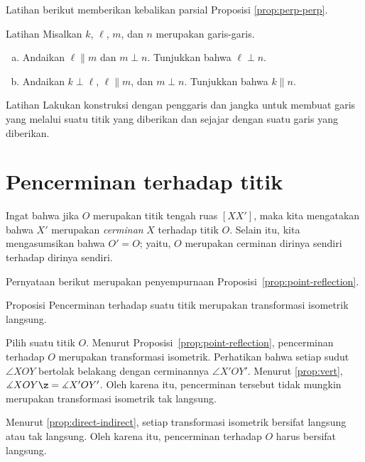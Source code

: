 Latihan berikut memberikan kebalikan parsial Proposisi \ref{prop:perp-perp}.

\begin{thm}[!]{Latihan}\label{ex:perp-perp}
Misalkan $k$, $\ell$, $m$, dan $n$ merupakan garis-garis.
\begin{enumerate}[(a)]
 \item\label{ex:perp-perp:a}
 Andaikan $\ell\parallel m$ dan $m\perp n$.
 Tunjukkan bahwa $\ell\perp n$.
 \item\label{ex:perp-perp:b}
 Andaikan $k\perp \ell$, $\ell\parallel m$, dan $m\perp n$.
 Tunjukkan bahwa $k\parallel n$.
\end{enumerate}

\end{thm}

\begin{thm}{Latihan}\label{ex:construction-parallel}
Lakukan konstruksi dengan penggaris dan jangka untuk membuat garis yang melalui suatu titik yang diberikan dan sejajar dengan suatu garis yang diberikan.
\end{thm}

\section{Pencerminan terhadap titik}

Ingat bahwa jika $O$ merupakan titik tengah ruas $[XX']$,
maka kita mengatakan bahwa $X'$ merupakan \emph{cerminan} $X$ terhadap titik $O$.
Selain itu, kita mengasumsikan bahwa $O'=O$; yaitu, $O$ merupakan cerminan dirinya sendiri terhadap dirinya sendiri.

Pernyataan berikut merupakan penyempurnaan Proposisi~\ref{prop:point-reflection}.

\begin{thm}[\abs]{Proposisi}\label{prop:point-reflection+}
Pencerminan terhadap suatu titik merupakan transformasi isometrik langsung.
\end{thm}

Pilih suatu titik $O$.
Menurut Proposisi~\ref{prop:point-reflection}, pencerminan terhadap $O$ merupakan transformasi isometrik.
Perhatikan bahwa setiap sudut $\angle XOY$ bertolak belakang dengan cerminannya $\angle X'OY'$.
Menurut \ref{prop:vert}, $\measuredangle XOY\z=\measuredangle X'OY'$.
Oleh karena itu, pencerminan tersebut tidak mungkin merupakan transformasi isometrik tak langsung.

Menurut \ref{prop:direct-indirect}, setiap transformasi isometrik bersifat langsung atau tak langsung.
Oleh karena itu, pencerminan terhadap $O$ harus bersifat langsung.
\qeds

